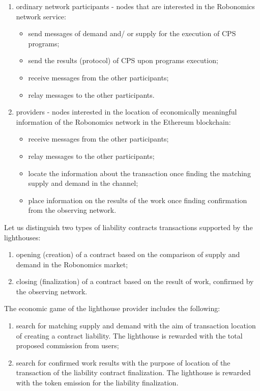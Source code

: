 \documentclass{article}
\begin{document}
\begin{enumerate}
   \item ordinary network participants - nodes that are interested in the Robonomics network service:
   \begin{itemize}
     \item send messages of demand and/ or supply for the execution of CPS programs;
     \item send the results (protocol) of CPS upon programs execution;
     \item receive messages from the other participants;
     \item relay messages to the other participants.
   \end{itemize}
   \item providers - nodes interested in the location of economically meaningful information of the Robonomics network in the Ethereum blockchain:
   \begin{itemize}
     \item receive messages from the other participants;
     \item relay messages to the other participants;
     \item locate the information about the transaction once finding the matching supply and demand in the channel;
     \item place information on the results of the work once finding confirmation from the observing network.
   \end{itemize}
\end{enumerate}

Let us distinguish two types of liability contracts transactions supported by the lighthouses:

\begin{enumerate}
	\item opening (creation) of a contract based on the comparison of supply and demand in the Robonomics market;
	\item closing (finalization) of a contract based on the result of work, confirmed by the observing network. 
\end{enumerate}

The economic game of the lighthouse provider includes the following:

\begin{enumerate}
	\item search for matching supply and demand with the aim of transaction location of creating a contract liability. The lighthouse is rewarded with the total proposed commission from users;
	\item search for confirmed work results with the purpose of location of the transaction of the liability contract finalization. The lighthouse is rewarded with the token emission for the liability finalization.
\end{enumerate}
\end{document}
